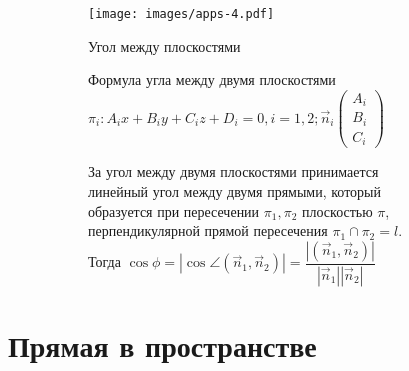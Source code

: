\begin{enumerate}
	
		\begin{figure}[h]
			\begin{subfigure}[b!]{0.4\linewidth}
				\centering
				\texttt{[image: images/apps-4.pdf]}
				\caption*{Угол между плоскостями}
				\label{Apps2}
			\end{subfigure}
		\begin{subfigure}[t!]{0.6\linewidth}
			\item Формула угла между двумя плоскостями\\
			\(\pi_i: A_ix+B_iy+C_iz+D_i = 0, i = 1, 2; \vec n_i\begin{pmatrix}
				A_i \\ B_i \\ C_i
			\end{pmatrix}\)
			\begin{definition}
				За угол между двумя плоскостями принимается линейный угол между двумя прямыми, который образуется при пересечении $\pi_1, \pi_2$ плоскостью \(\pi\), перпендикулярной прямой пересечения \(\pi_1\cap \pi_2 = l\). Тогда \(\cos \phi = |\cos\angle(\vec n_1, \vec n_2)| = \dfrac{|(\vec n_1, \vec n_2)|}{|\vec n_1||\vec n_2|}\)
			\end{definition}
		\end{subfigure}
	\end{figure}
	
\end{enumerate}
\section{Прямая в пространстве}

